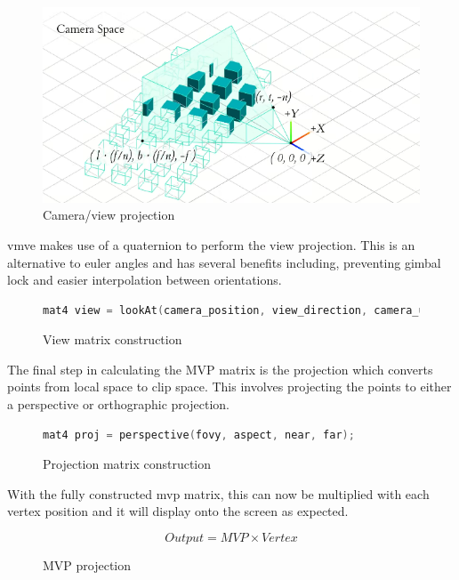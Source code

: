\documentclass[11pt]{article}
\begin{document}
\begin{figure}[h!]
  \centering
  \includegraphics[width=\textwidth]{images/camera_space.png}
  \caption{Camera/view projection \cite{camera_projection}}
  \label{fig:camera_projection} 
\end{figure}

\gls{vmve} makes use of a quaternion to perform the view projection. This is an
alternative to euler angles and has several benefits including, preventing gimbal
lock and easier interpolation between orientations.
\begin{figure}[ht]
  \centering
  \begin{lstlisting}[language=C++]
    mat4 view = lookAt(camera_position, view_direction, camera_up);
  \end{lstlisting}
  \caption{View matrix construction}
  \label{fig:world_to_view}
\end{figure}


The final step in calculating the MVP matrix is the projection which converts
points from local space to clip space. This involves projecting the points to
either a perspective or orthographic projection.
\begin{figure}[ht]
  \centering
  \begin{lstlisting}[language=C++]
    mat4 proj = perspective(fovy, aspect, near, far);
  \end{lstlisting}
  \caption{Projection matrix construction}
  \label{fig:local_to_projection}
\end{figure}

With the fully constructed mvp matrix, this can now be multiplied with each
vertex position and it will display onto the screen as expected.
\begin{figure}[h!]
  \centering  
  \begin{equation}
    Output = MVP \times Vertex
  \end{equation}
  \caption{MVP projection}
  \label{fig:mvp_projection}
\end{figure}
\end{document}
